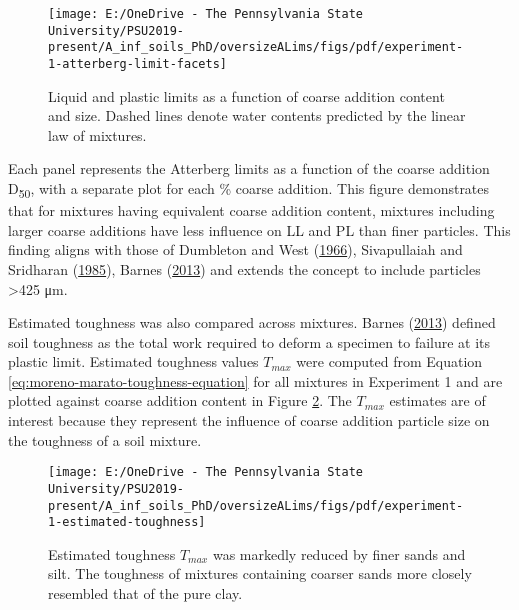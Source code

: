 \documentclass[
  letterpaper,
]{article}
\begin{document}
\begin{figure}

{\centering \texttt{[image: E:/OneDrive - The Pennsylvania State University/PSU2019-present/A\_inf\_soils\_PhD/oversizeALims/figs/pdf/experiment-1-atterberg-limit-facets]} 

}

\caption{Liquid and plastic limits as a function of coarse addition content and size. Dashed lines denote water contents predicted by the linear law of mixtures.}\label{fig:experiment-1-atterberg-limit-facets}
\end{figure}

Each panel represents the Atterberg limits as a function of the coarse addition D\textsubscript{50}, with a separate plot for each \% coarse addition.
This figure demonstrates that for mixtures having equivalent coarse addition content, mixtures including larger coarse additions have less influence on LL and PL than finer particles.
This finding aligns with those of Dumbleton and West (\protect\hyperlink{ref-Dumbleton1966b}{1966}), Sivapullaiah and Sridharan (\protect\hyperlink{ref-Sivapullaiah1985}{1985}), Barnes (\protect\hyperlink{ref-Barnes2013}{2013}) and extends the concept to include particles \textgreater425 μm.

Estimated toughness was also compared across mixtures.
Barnes (\protect\hyperlink{ref-Barnes2013}{2013}) defined soil toughness as the total work required to deform a specimen to failure at its plastic limit.
Estimated toughness values \(T_{max}\) were computed from Equation \eqref{eq:moreno-marato-toughness-equation} for all mixtures in Experiment 1 and are plotted against coarse addition content in Figure \ref{fig:experiment-1-estimated-toughness}.
The \(T_{max}\) estimates are of interest because they represent the influence of coarse addition particle size on the toughness of a soil mixture.

\begin{figure}

{\centering \texttt{[image: E:/OneDrive - The Pennsylvania State University/PSU2019-present/A\_inf\_soils\_PhD/oversizeALims/figs/pdf/experiment-1-estimated-toughness]} 

}

\caption{Estimated toughness $T_{max}$ was markedly reduced by finer sands and silt. The toughness of mixtures containing coarser sands more closely resembled that of the pure clay.}\label{fig:experiment-1-estimated-toughness}
\end{figure}
\end{document}
